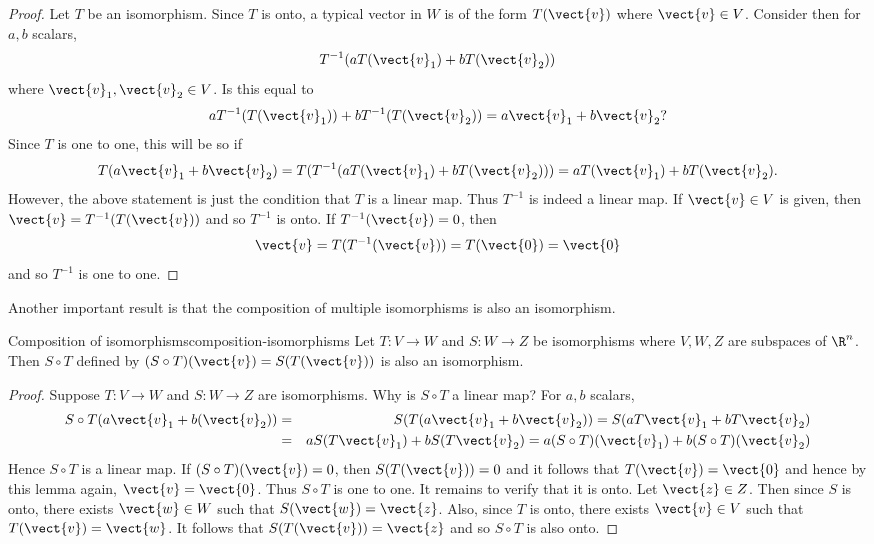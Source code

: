 \begin{proof} Let $T$ be an isomorphism.  Since $T$ is onto, a typical
vector in $W$ is of the form $T(\vect{v})$ where $\vect{v} \in V$. Consider then for $a,b$
scalars,
\begin{equation*}
T^{-1}(aT(\vect{v}_{1})+bT(\vect{v}_{2}))
\end{equation*}
where $\vect{v}_{1}, \vect{v}_2 \in V$. Is this equal to
\begin{equation*}
aT^{-1}(T (\vect{v}_{1})) +bT^{-1}(T(\vect{v}_{2})) =a\vect{v}_{1}+b\vect{v}_{2}?
\end{equation*}
Since $T$ is one to one, this will be so if
\begin{equation*}
T(a\vect{v}_{1}+b\vect{v}_{2}) =T(T^{-1}(aT(\vect{v}_{1})+bT(\vect{v}_{2}))
) =aT(\vect{v}_{1})+bT(\vect{v}_{2}).
\end{equation*}
However, the above statement is just the condition that $T$ is a linear map.
Thus $T^{-1}$ is indeed a linear map. If $\vect{v} \in V$ is given, then $\vect{v}=T^{-1}(T(\vect{v})) $ and so $T^{-1}$ is onto. If $T^{-1} (\vect{v})=0$, then
\begin{equation*}
\vect{v}=T(T^{-1}(\vect{v})) =T(\vect{0})=\vect{0}
\end{equation*}
and so $T^{-1}$ is one to one.
\end{proof}

Another important result is that the composition of multiple isomorphisms is also an isomorphism.

\begin{proposition}{Composition of isomorphisms}{composition-isomorphisms}
Let $T:V\rightarrow W$ and  $S:W\rightarrow Z$ be isomorphisms where $V,W,Z$ are subspaces of $\R^n$. Then $S\circ
T $ defined by $(S\circ T) (\vect{v}) = S(
T(\vect{v})) $ is also an isomorphism.
\end{proposition}

\begin{proof}
Suppose $T:V\rightarrow W$ and  $S:W\rightarrow Z$ are isomorphisms. Why is $S\circ T$ a linear map?
For $a,b$ scalars,
\begin{eqnarray*}
S\circ T(a\vect{v}_{1}+b(\vect{v}_{2}))
&=& S(T(a\vect{v}_{1}+b\vect{v}_{2})) =S(aT\vect{v}_{1}+bT\vect{v}_{2}) \\
&=&aS(T\vect{v}_{1}) +bS(T\vect{v}_{2}) = a(S\circ
T) (\vect{v}_{1}) +b(S\circ T) (\vect{v}_{2})
\end{eqnarray*}
Hence $S\circ T$ is a linear map. If $(S\circ T) (\vect{v})
=0$, then $S(T(\vect{v})) =0$ and it follows that $T(\vect{v})=\vect{0}$ and hence by this lemma again, $\vect{v}=\vect{0}$. Thus $S\circ
T $ is one to one. It remains to verify that it is onto. Let $\vect{z} \in Z$. Then
since $S$ is onto, there exists $\vect{w} \in W$ such that $S(\vect{w})=\vect{z}$. Also, since $T$
is onto, there exists $\vect{v}\in V$ such that $T(\vect{v})=\vect{w}$. It follows that $S(
T(\vect{v})) =\vect{z}$ and so $S\circ T$ is also onto.
\end{proof}

